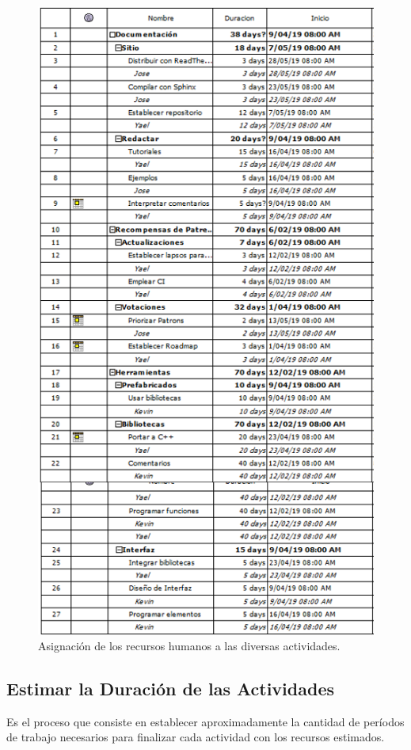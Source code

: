 \documentclass[]{article}
\begin{document}
\begin{figure} [H]
	\centering
	\includegraphics[width=1\textwidth]{actividades_asignadas}
	\caption{Asignaci\'on de los recursos humanos a las diversas actividades.} 
	\label{ASG}
\end{figure}
\subsection{Estimar la Duraci\'on de las Actividades} 
Es el proceso que consiste en establecer
aproximadamente la cantidad de per\'iodos de trabajo necesarios para finalizar cada
actividad con los recursos estimados.
\end{document}
